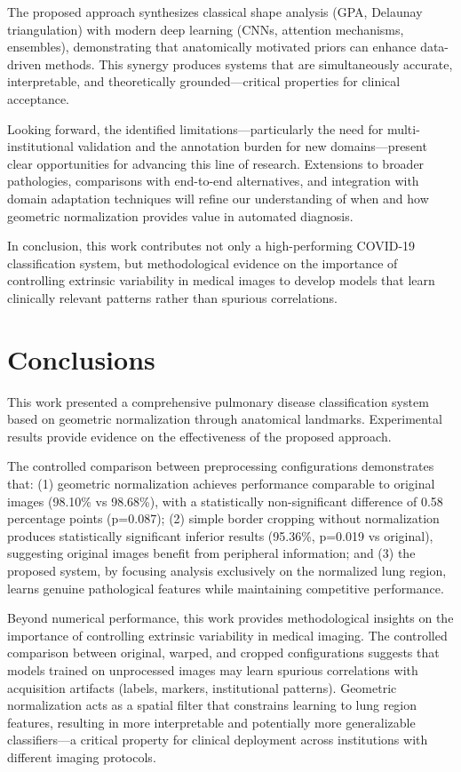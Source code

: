 \documentclass[applsci,article,submit,pdftex,moreauthors]{Definitions/mdpi}
\begin{document}
The proposed approach synthesizes classical shape analysis (GPA, Delaunay triangulation) with modern deep learning (CNNs, attention mechanisms, ensembles), demonstrating that anatomically motivated priors can enhance data-driven methods. This synergy produces systems that are simultaneously accurate, interpretable, and theoretically grounded---critical properties for clinical acceptance.

Looking forward, the identified limitations---particularly the need for multi-institutional validation and the annotation burden for new domains---present clear opportunities for advancing this line of research. Extensions to broader pathologies, comparisons with end-to-end alternatives, and integration with domain adaptation techniques will refine our understanding of when and how geometric normalization provides value in automated diagnosis.

In conclusion, this work contributes not only a high-performing COVID-19 classification system, but methodological evidence on the importance of controlling extrinsic variability in medical images to develop models that learn clinically relevant patterns rather than spurious correlations.

\section{Conclusions}

This work presented a comprehensive pulmonary disease classification system based on geometric normalization through anatomical landmarks. Experimental results provide evidence on the effectiveness of the proposed approach.

The controlled comparison between preprocessing configurations demonstrates that: (1) geometric normalization achieves performance comparable to original images (98.10\% vs 98.68\%), with a statistically non-significant difference of 0.58 percentage points (p=0.087); (2) simple border cropping without normalization produces statistically significant inferior results (95.36\%, p=0.019 vs original), suggesting original images benefit from peripheral information; and (3) the proposed system, by focusing analysis exclusively on the normalized lung region, learns genuine pathological features while maintaining competitive performance.

Beyond numerical performance, this work provides methodological insights on the importance of controlling extrinsic variability in medical imaging. The controlled comparison between original, warped, and cropped configurations suggests that models trained on unprocessed images may learn spurious correlations with acquisition artifacts (labels, markers, institutional patterns). Geometric normalization acts as a spatial filter that constrains learning to lung region features, resulting in more interpretable and potentially more generalizable classifiers---a critical property for clinical deployment across institutions with different imaging protocols.
\end{document}
